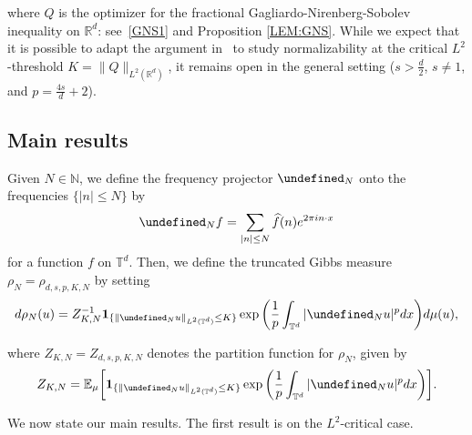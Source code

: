 \documentclass[letterpaper, 11pt,  reqno]{amsart}
\newcommand{\noi}{\noindent}
\newcommand{\R}{\mathbb{R}}
\let\P= \undefined
\newcommand{\P}{\mathbf{P}}
\newcommand{\ind}{\mathbf 1}
\newcommand{\N}{\mathbb{N}}
\numberwithin{equation}{section}
\numberwithin{theorem}{section}
\begin{document}
\noi
where $Q$ is 
 the %
 optimizer for the fractional Gagliardo-Nirenberg-Sobolev inequality 
on $\R^d$: see~\eqref{GNS1} 
and  Proposition \ref{LEM:GNS}. 
While we expect that it is possible to adapt
the argument in~\cite{OST1} to study 
normalizability
at the critical $L^2$-threshold $K = \|Q\|_{L^2(\R^d)}$, 
it remains open in the general setting
($s > \frac d2$, $s \ne 1$, and 
$p = \frac{4s}{d} + 2$).


















\subsection{Main results}
\label{SUBSEC:1.2}	


 Given  $N\in \N$, we define the  frequency projector $\P_{N}$  
 onto the frequencies $\{ |n|\le N\}$ by 
\begin{align}
\P_{N} f = \sum_{ |n| \leq N}  \widehat f (n)  e^{2\pi in\cdot x}
\label{P1}
\end{align}
\noi
for a function $f$  on $\mathbb{T}^d$. 
Then, 
we define  the truncated  Gibbs measure $\rho_N = \rho_{d,s, p,K,N}$ by
setting
\begin{align}
\begin{split}
d \rho_N (u) 
 = Z_{K,N}^{-1} 
\ind_{\{\|\P_{N} u\|_{L^2(\mathbb{T}^d)}\le K\}}\exp 
\bigg({\frac 1 p\int_{\mathbb{T}^d}  | \P_{N} u|^p   dx} \bigg) d \mu (u), 
\end{split}
\label{GibbsN}
\end{align}


\noi
where 
$Z_{K, N} = Z_{d, s, p, K, N}$
denotes the   partition function for $\rho_N$,  given by 
\begin{align}
Z_{K, N} = 
\mathbb{E}_{\mu}\bigg[
\ind_{\{ \| \P_{N} u \|_{L^2 (\mathbb{T}^d)}\leq K \}} \exp\bigg( \frac 1 p\int_{\mathbb{T}^d}  | \P_{N} u|^p   dx \bigg)\bigg].
\label{Z1} 
\end{align}





We now state our main results.
The first result is on the $L^2$-critical case.
\end{document}
